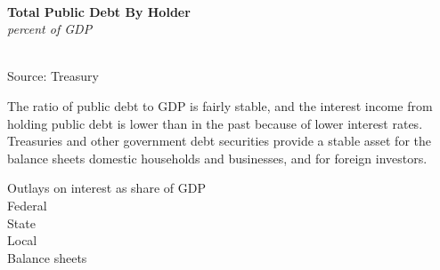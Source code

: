 \documentclass{report}
\makeatletter
\newcommand{\tbllink}[1]{\href{https://raw.githubusercontent.com/bdecon/US-chartbook/master/chartbook/data/#1}{\faTable}}
\newcommand*\short[1]{\expandafter\@gobbletwo\number\numexpr#1\relax}
\newcommand{\sbar}[4]{
		\addplot[ybar stacked, bar width=2.7pt, draw opacity=0, fill=#1] 
			table [x=#2, y=#3, col sep=comma]{#4};}
\newcommand{\dateaxisticks}{
		date coordinates in=x, axis line style={draw=none},
		xmax={2020-02-01},
		max space between ticks=40,	    
		xtick={{1990-01-01}, {1992-01-01}, {1994-01-01}, 
			{1996-01-01}, {1998-01-01}, {2000-01-01}, 
			{2002-01-01}, {2004-01-01}, {2006-01-01},
			{2008-01-01}, {2010-01-01}, {2012-01-01}, {2014-01-01},
		    {2016-01-01}, {2018-01-01}, {2020-01-01}},
		minor xtick={{1989-01-01}, {1991-01-01}, {1993-01-01},
			{1995-01-01}, {1997-01-01}, {1999-01-01}, 
			{2001-01-01}, {2003-01-01}, {2005-01-01}, {2007-01-01},
		    {2009-01-01}, {2011-01-01}, {2013-01-01}, {2015-01-01},
		    {2017-01-01}, {2019-01-01}},
		enlarge y limits={0.06}, enlarge x limits={0.01},
		}
\newcommand{\bbar}[2]{extra #1 ticks = {{#2}}, extra #1 tick labels = ,
		extra #1 tick style = {grid=major, grid style={thick, black!25}},}
\newcommand{\rbars}{
		\fill[color=black!10] (axis cs:{1990-07-01},\pgfkeysvalueof{/pgfplots/ymin}) rectangle 
			(axis cs:{1991-03-01}, \pgfkeysvalueof{/pgfplots/ymax});
		\fill[color=black!10] (axis cs:{2007-12-01},\pgfkeysvalueof{/pgfplots/ymin}) rectangle 
			(axis cs:{2009-07-01}, \pgfkeysvalueof{/pgfplots/ymax});
		\fill[color=black!10] (axis cs:{2001-03-01},\pgfkeysvalueof{/pgfplots/ymin}) rectangle 
			(axis cs:{2001-11-01}, \pgfkeysvalueof{/pgfplots/ymax});}
\makeatother
\begin{document}
{{{{\begin{minipage}{0.76\textwidth}
\end{minipage}


\newpage
\begin{minipage}{0.76\textwidth}

\small \\

\vspace{2mm}

\noindent \normalsize \textbf{Total Public Debt By Holder}\\
\footnotesize{\textit{percent of GDP}}\\
\noindent \hspace*{-2mm} \\
\footnotesize{Source: Treasury} \hfill \tbllink{pubdebt.csv}\\

\vspace{2mm}

\small The ratio of public debt to GDP is fairly stable, and the interest income from holding public debt is lower than in the past because of lower interest rates. Treasuries and other government debt securities provide a stable asset for the balance sheets domestic households and businesses, and for foreign investors. \\

\vspace{4mm}

\normalsize
Outlays on interest as share of GDP \\

Federal\\

State \\

Local \\

Balance sheets \\


\end{minipage}}}}}
\end{document}
